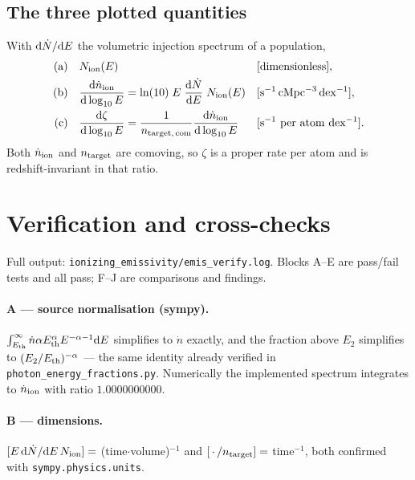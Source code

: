\documentclass[11pt,a4paper]{article}
\begin{document}
\subsection{The three plotted quantities}
With ${\rm d}\dot N/{\rm d}E$ the volumetric injection spectrum of a
population,
\begin{align}
  \text{(a)}\quad & N_{\rm ion}(E) && \text{[dimensionless]},\\
  \text{(b)}\quad & \frac{{\rm d}\dot n_{\rm ion}}{{\rm d}\log_{10}E}
    = \ln(10)\; E \; \frac{{\rm d}\dot N}{{\rm d}E}\; N_{\rm ion}(E)
    && [{\rm s^{-1}\,cMpc^{-3}\,dex^{-1}}],\\
  \text{(c)}\quad & \frac{{\rm d}\zeta}{{\rm d}\log_{10}E}
    = \frac{1}{n_{{\rm target},\,\rm com}}
      \frac{{\rm d}\dot n_{\rm ion}}{{\rm d}\log_{10}E}
    && [{\rm s^{-1}\ per\ atom\ dex^{-1}}].
\end{align}
Both $\dot n_{\rm ion}$ and $n_{\rm target}$ are comoving, so $\zeta$ is a
proper rate per atom and is redshift-invariant in that ratio.

\section{Verification and cross-checks}\label{sec:verif}
Full output: \texttt{ionizing\_emissivity/emis\_verify.log}.  Blocks A--E are
pass/fail tests and all pass; F--J are comparisons and findings.

\paragraph{A --- source normalisation (sympy).}
$\int_{E_{\rm th}}^{\infty}\dot n\alpha E_{\rm th}^\alpha E^{-\alpha-1}
{\rm d}E$ simplifies to $\dot n$ exactly, and the fraction above $E_2$
simplifies to $(E_2/E_{\rm th})^{-\alpha}$ --- the same identity already
verified in \texttt{photon\_\allowbreak energy\_\allowbreak fractions.py}.  Numerically the
implemented spectrum integrates to $\dot n_{\rm ion}$ with ratio
$1.0000000000$.

\paragraph{B --- dimensions.}
$[E\,{\rm d}\dot N/{\rm d}E\,N_{\rm ion}] = $ (time$\cdot$volume)$^{-1}$ and
$[\,\cdot\,/n_{\rm target}] = $ time$^{-1}$, both confirmed with
\texttt{sympy.physics.units}.
\end{document}
